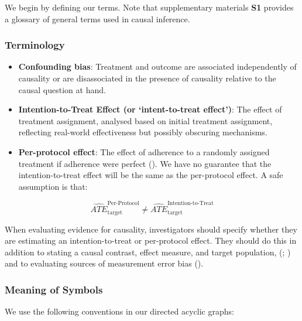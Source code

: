 \documentclass[
  single column]{article}
\begin{document}
We begin by defining our terms. Note that supplementary materials
\textbf{S1} provides a glossary of general terms used in causal
inference.

\subsubsection{Terminology}\label{terminology}

\begin{itemize}
\item
  \textbf{Confounding bias}: Treatment and outcome are associated
  independently of causality or are disassociated in the presence of
  causality relative to the causal question at hand.
\item
  \textbf{Intention-to-Treat Effect (or `intent-to-treat effect')}: The
  effect of treatment assignment, analysed based on initial treatment
  assignment, reflecting real-world effectiveness but possibly obscuring
  mechanisms.
\item
  \textbf{Per-protocol effect}: The effect of adherence to a randomly
  assigned treatment if adherence were perfect
  (). We have no
  guarantee that the intention-to-treat effect will be the same as the
  per-protocol effect. A safe assumption is that:
\end{itemize}

\[
\widehat{ATE}_{\text{target}}^{\text{Per-Protocol}} \ne \widehat{ATE}_{\text{target}}^{\text{Intention-to-Treat}}
\]

When evaluating evidence for causality, investigators should specify
whether they are estimating an intention-to-treat or per-protocol
effect. They should do this in addition to stating a causal contrast,
effect measure, and target population,
(;
) and to evaluating
sources of measurement error bias
().

\subsubsection{Meaning of Symbols}\label{meaning-of-symbols}

We use the following conventions in our directed acyclic graphs:
\end{document}
